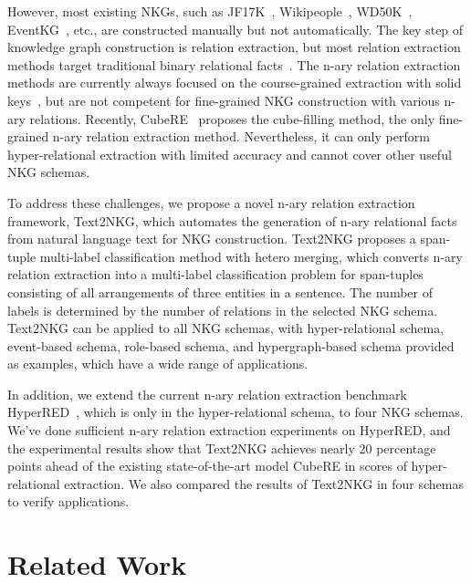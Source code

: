 \documentclass{article} \usepackage{iclr2024_conference,times}
\begin{document}
However, most existing NKGs, such as JF17K~\citep{m-TransH}, Wikipeople~\citep{NaLP}, WD50K~\citep{StarE}, EventKG~\citep{EventSurvey}, etc., are constructed manually but not automatically. The key step of knowledge graph construction is relation extraction, but most relation extraction methods target traditional binary relational facts~\citep{table-filling,PURE,PL-Marker}. The n-ary relation extraction methods are currently always focused on the course-grained extraction with solid keys~\citep{documentlevelNRE,ReSel}, but are not competent for fine-grained NKG construction with various n-ary relations. Recently, CubeRE~\citep{HyperRED} proposes the cube-filling method, the only fine-grained n-ary relation extraction method. Nevertheless, it can only perform hyper-relational extraction with limited accuracy and cannot cover other useful NKG schemas.

To address these challenges, we propose a novel n-ary relation extraction framework, Text2NKG, which automates the generation of n-ary relational facts from natural language text for NKG construction. Text2NKG proposes a span-tuple multi-label classification method with hetero merging, which converts n-ary relation extraction into a multi-label classification problem for span-tuples consisting of all arrangements of three entities in a sentence. The number of labels is determined by the number of relations in the selected NKG schema. Text2NKG can be applied to all NKG schemas, with hyper-relational schema, event-based schema, role-based schema, and hypergraph-based schema provided as examples, which have a wide range of applications.

In addition, we extend the current n-ary relation extraction benchmark HyperRED~\citep{HyperRED}, which is only in the hyper-relational schema, to four NKG schemas. We've done sufficient n-ary relation extraction experiments on HyperRED, and the experimental results show that Text2NKG achieves nearly 20 percentage points ahead of the existing state-of-the-art model CubeRE in  scores of hyper-relational extraction. We also compared the results of Text2NKG in four schemas to verify applications. 







\section{Related Work}
\end{document}
